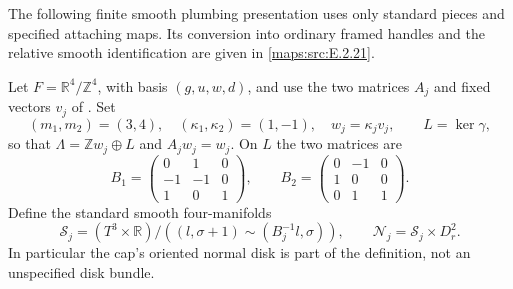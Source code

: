 \begin{proposition}\label{maps:src:E.2.20}


The following finite smooth plumbing presentation uses only standard
pieces and specified attaching maps. Its conversion into ordinary
framed handles and the relative smooth identification are given in \ref{maps:src:E.2.21}.

Let $F=\mathbb R^4/\mathbb Z^4$, with basis $(g,u,w,d)$, and use the
two matrices $A_j$ and fixed vectors $v_j$ of .  Set
\[
 (m_1,m_2)=(3,4),\quad(\kappa_1,\kappa_2)=(1,-1),\quad
 w_j=\kappa_jv_j,\qquad L=\ker\gamma,
\]
so that $\Lambda=\mathbb Zw_j\oplus L$ and $A_jw_j=w_j$.
On $L$ the two matrices are
\[
 B_1=\begin{pmatrix}0&1&0\\-1&-1&0\\1&0&1\end{pmatrix},
 \qquad
 B_2=\begin{pmatrix}0&-1&0\\1&0&0\\0&1&1\end{pmatrix}.
 \tag{E.U1}\label{maps:eq:E.U1}
\]
Define the standard smooth four-manifolds
\[
 \mathcal S_j=(T^3\times\mathbb R)/
       ((l,\sigma+1)\sim(B_j^{-1}l,\sigma)),
 \qquad \mathcal N_j=\mathcal S_j\times D^2_r.
 \tag{E.U2}\label{maps:eq:E.U2}
\]
In particular the cap's oriented normal disk is part of the
definition, not an unspecified disk bundle.


\end{proposition}
